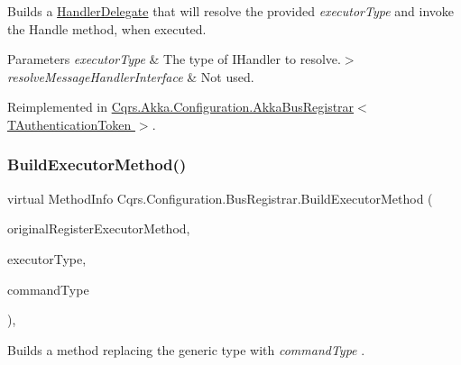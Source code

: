 Builds a \hyperlink{classCqrs_1_1Configuration_1_1HandlerDelegate}{Handler\+Delegate} that will resolve the provided {\itshape executor\+Type}  and invoke the Handle method, when executed. 


\begin{DoxyParams}{Parameters}
{\em executor\+Type} & The type of I\+Handler to resolve.$>$\\
\hline
{\em resolve\+Message\+Handler\+Interface} & Not used.\\
\hline
\end{DoxyParams}


Reimplemented in \hyperlink{classCqrs_1_1Akka_1_1Configuration_1_1AkkaBusRegistrar_ad7e3e5d332d5b4d781375a28f23bdb19_ad7e3e5d332d5b4d781375a28f23bdb19}{Cqrs.\+Akka.\+Configuration.\+Akka\+Bus\+Registrar$<$ T\+Authentication\+Token $>$}.

\mbox{\label{classCqrs_1_1Configuration_1_1BusRegistrar_a03ecf12389b8f55b75c887e113520ac7_a03ecf12389b8f55b75c887e113520ac7}} 
\subsubsection{\texorpdfstring{Build\+Executor\+Method()}{BuildExecutorMethod()}}
{\footnotesize\ttfamily virtual Method\+Info Cqrs.\+Configuration.\+Bus\+Registrar.\+Build\+Executor\+Method (\begin{DoxyParamCaption}\item[{Method\+Info}]{original\+Register\+Executor\+Method,  }\item[{Type}]{executor\+Type,  }\item[{Type}]{command\+Type }\end{DoxyParamCaption})\hspace{0.3cm}{\ttfamily [protected]}, {\ttfamily [virtual]}}



Builds a method replacing the generic type with {\itshape command\+Type} . 

\mbox{\label{classCqrs_1_1Configuration_1_1BusRegistrar_a159eba5ece9015165be70676a52d8127_a159eba5ece9015165be70676a52d8127}} 
